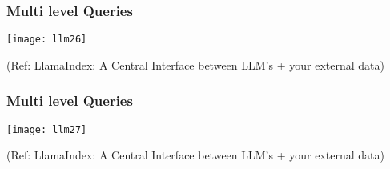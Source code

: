 \begin{frame}[fragile]\frametitle{Multi level Queries}

\begin{center}
\texttt{[image: llm26]}

{\tiny (Ref: LlamaIndex: A Central Interface between LLM's + your external data)}
\end{center}
\end{frame}

\begin{frame}[fragile]\frametitle{Multi level Queries}

\begin{center}
\texttt{[image: llm27]}

{\tiny (Ref: LlamaIndex: A Central Interface between LLM's + your external data)}
\end{center}
\end{frame}